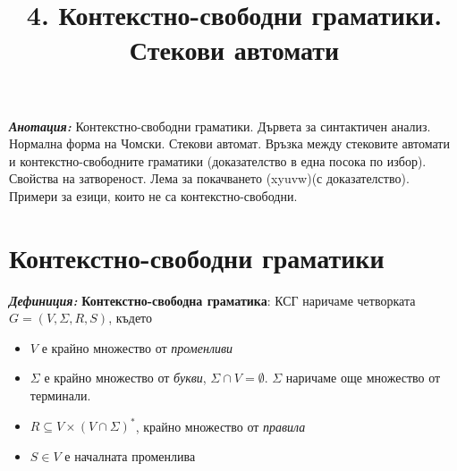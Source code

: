 \documentclass[11pt]{article}
\title{4. Контекстно-свободни граматики. Стекови автомати}
\begin{document}
\maketitle

\newcommand{\lrangle}[1]{\left\langle #1 \right\rangle}

\newcommand{\belongsTo}{\in}
\newcommand{\notBelongsTo}{\centernot\in}

\newcommand{\oversetModels}[1]{\overset{#1}{\models}}

\newcommand{\kda}{A = <Q, X, q_{0}, \delta, F>}
\newcommand{\cfg}{\Gamma = <\mathcal{N}, \mathcal{T}, \mathcal{S}, \mathcal{P}>}
\newcommand{\cfgVers}{G = \langle V, \Sigma, R, S \rangle}
\newcommand{\nsa}{A = <Q, X, Z, q_{0}, z_{0}, \delta, F>}

\newcommand{\italicBold}[1]{\textbf{\emph{#1}}}
\newcommand{\definition}{\italicBold{Дефиниция: }}
\newcommand{\theorem}{\italicBold{Теорема: }}
\newcommand{\lemma}{\italicBold{Лема: }}
\newcommand{\proof}{\italicBold{Доказателство: }}
\newcommand{\sample}{\italicBold{Пример: }}

\newcommand{\curlies}[1]{\{#1\}}

\newcommand{\enumNum}{\renewcommand{\theenumi}{\arabic{enumi}}}
\newcommand{\enumlet}{\renewcommand{\theenumi}{\alph{enumi}}}

\italicBold{Анотация:} Контекстно-свободни граматики. Дървета за синтактичен анализ. Нормална форма на Чомски. Стекови автомат. Връзка между стековите автомати и контекстно-свободните граматики (доказателство в една посока по избор). Свойства на затвореност. Лема за покачването (xyuvw)(с доказателство). Примери за езици, които не са контекстно-свободни.

\section{Контекстно-свободни граматики}

\definition \textbf{Контекстно-свободна граматика}: КСГ наричаме четворката $G = (V, \Sigma, R, S)$, където
\begin{itemize}[noitemsep]
	\item $V$ е крайно множество от \textit{променливи}
	\item $\Sigma$ е крайно множество от \textit{букви}, $\Sigma\cap V = \emptyset$. $\Sigma$ наричаме още множество от терминали.
	\item $R \subseteq V \times (V \cap \Sigma)^{*}$, крайно множество от \textit{правила}
	\item $S \in V$ е началната променлива
\end{itemize}
\end{document}
